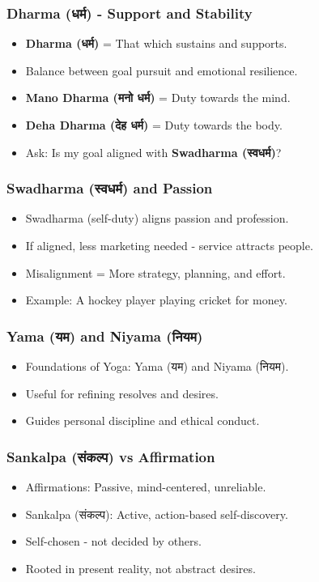 \begin{frame}[fragile]\frametitle{Dharma (धर्म) - Support and Stability}
      \begin{itemize}
        \item \textbf{Dharma (धर्म)} = That which sustains and supports.
        \item Balance between goal pursuit and emotional resilience.
        \item \textbf{Mano Dharma (मनो धर्म)} = Duty towards the mind.
        \item \textbf{Deha Dharma (देह धर्म)} = Duty towards the body.
        \item Ask: Is my goal aligned with \textbf{Swadharma (स्वधर्म)}?
      \end{itemize}
\end{frame}

\begin{frame}[fragile]\frametitle{Swadharma (स्वधर्म) and Passion}
      \begin{itemize}
        \item Swadharma (self-duty) aligns passion and profession.
        \item If aligned, less marketing needed - service attracts people.
        \item Misalignment = More strategy, planning, and effort.
        \item Example: A hockey player playing cricket for money.
      \end{itemize}
\end{frame}

\begin{frame}[fragile]\frametitle{Yama (यम) and Niyama (नियम)}
      \begin{itemize}
        \item Foundations of Yoga: Yama (यम) and Niyama (नियम).
        \item Useful for refining resolves and desires.
        \item Guides personal discipline and ethical conduct.
      \end{itemize}
\end{frame}

\begin{frame}[fragile]\frametitle{Sankalpa (संकल्प) vs Affirmation}
      \begin{itemize}
        \item Affirmations: Passive, mind-centered, unreliable.
        \item Sankalpa (संकल्प): Active, action-based self-discovery.
        \item Self-chosen - not decided by others.
        \item Rooted in present reality, not abstract desires.
      \end{itemize}
\end{frame}

